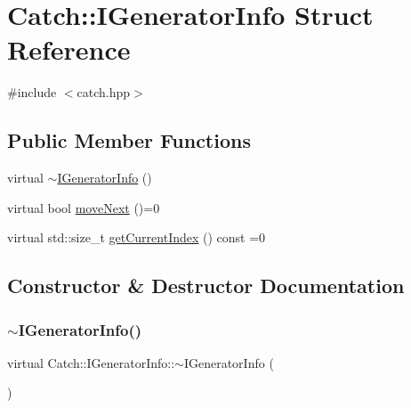 \hypertarget{struct_catch_1_1_i_generator_info}{}\section{Catch\+:\+:I\+Generator\+Info Struct Reference}
\label{struct_catch_1_1_i_generator_info}


{\ttfamily \#include $<$catch.\+hpp$>$}

\subsection*{Public Member Functions}
\begin{DoxyCompactItemize}
\item 
virtual \hyperlink{struct_catch_1_1_i_generator_info_a9266aa62993298510c2a8b5948abb8e6}{$\sim$\+I\+Generator\+Info} ()
\item 
virtual bool \hyperlink{struct_catch_1_1_i_generator_info_a2b86711ca7009903edfe27ed62b515ef}{move\+Next} ()=0
\item 
virtual std\+::size\+\_\+t \hyperlink{struct_catch_1_1_i_generator_info_a6a0dca712d31f6849fd9447b1344673a}{get\+Current\+Index} () const =0
\end{DoxyCompactItemize}


\subsection{Constructor \& Destructor Documentation}
\hypertarget{struct_catch_1_1_i_generator_info_a9266aa62993298510c2a8b5948abb8e6}{}\label{struct_catch_1_1_i_generator_info_a9266aa62993298510c2a8b5948abb8e6} 
\subsubsection{\texorpdfstring{$\sim$\+I\+Generator\+Info()}{~IGeneratorInfo()}}
{\footnotesize\ttfamily virtual Catch\+::\+I\+Generator\+Info\+::$\sim$\+I\+Generator\+Info (\begin{DoxyParamCaption}{ }\end{DoxyParamCaption})\hspace{0.3cm}{\ttfamily [virtual]}}



